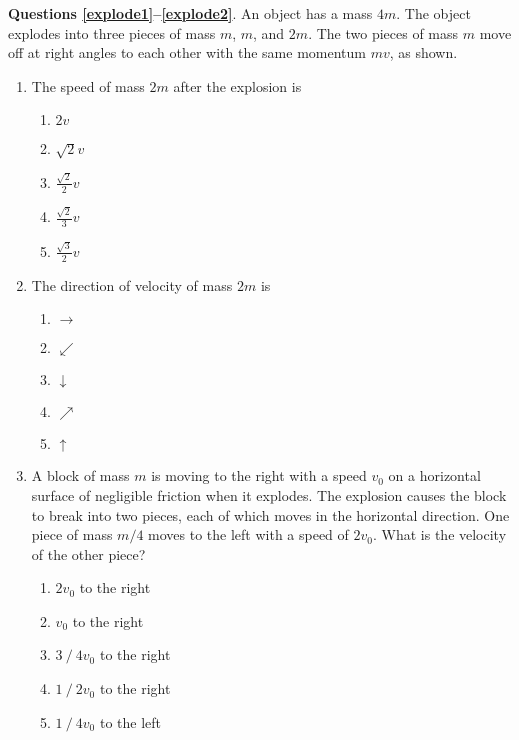 \documentclass{../../../oss-apphys}
\begin{document}
\begin{multicols*}{2}
  \textbf{Questions \ref{explode1}--\ref{explode2}}. An object has a mass $4m$.
  The object explodes into three pieces of mass $m$, $m$, and $2m$. The two
  pieces of mass $m$ move off at right angles to each other with the same
  momentum $mv$, as shown.
  \begin{center}
  \end{center}
  
  \begin{enumerate}[leftmargin=18pt,resume]
  \item The speed of mass $2m$ after the explosion is
    \label{explode1}
    \begin{enumerate}[nosep,leftmargin=18pt,label=(\Alph*)]
    \item $2v$
    \item $\displaystyle\sqrt2v$
    \item $\displaystyle\frac{\sqrt2}2v$
    \item $\displaystyle\frac{\sqrt2}3v$
    \item $\displaystyle\frac{\sqrt3}2v$
    \end{enumerate}
    
  \item The direction of velocity of mass $2m$ is
    \label{explode2}
    \begin{enumerate}[nosep,leftmargin=18pt,label=(\Alph*)]
    \item $\rightarrow$
    \item $\swarrow$
    \item $\downarrow$
    \item $\nearrow$
    \item $\uparrow$
    \end{enumerate}
  
  \item A block of mass $m$ is moving to the right with a speed $v_0$ on a
    horizontal surface of negligible friction when it explodes. The explosion
    causes the block to break into two pieces, each of which moves in the
    horizontal direction. One piece of mass $m/4$ moves to the left with a
    speed of $2v_0$. What is the velocity of the other piece?
    \begin{enumerate}[nosep,leftmargin=18pt,label=(\Alph*)]
    \item$2v_0$ to the right
    \item$v_0$ to the right
    \item$3⁄4 v_0$ to the right
    \item$1⁄2 v_0$ to the right
    \item$1⁄4 v_0$ to the left
    \end{enumerate}
  \end{enumerate}
  \columnbreak
  

\end{multicols*}
\end{document}
